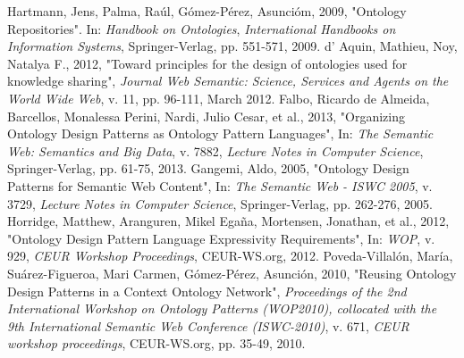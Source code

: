\begin{thebibliography}{100}
     Hartmann, Jens, Palma, Raúl, Gómez-Pérez, Asuncióm, 2009, "Ontology Repositories". In: \textit{Handbook on Ontologies}, \textit{International Handbooks on Information Systems}, Springer-Verlag, pp. 551-571, 2009.
     d' Aquin, Mathieu, Noy, Natalya F., 2012, "Toward principles for the design of ontologies used for knowledge sharing", \textit{Journal Web Semantic: Science, Services and Agents on the World Wide Web}, v. 11, pp. 96-111, March 2012.
     Falbo, Ricardo de Almeida, Barcellos, Monalessa Perini, Nardi, Julio Cesar, et al., 2013, "Organizing Ontology Design Patterns as Ontology Pattern Languages", In: \textit{The Semantic Web: Semantics and Big Data}, v. 7882, \textit{Lecture Notes in Computer Science}, Springer-Verlag, pp. 61-75, 2013.
     Gangemi, Aldo, 2005, "Ontology Design Patterns for Semantic Web Content", In: \textit{The Semantic Web - ISWC 2005}, v. 3729, \textit{Lecture Notes in Computer Science}, Springer-Verlag, pp. 262-276, 2005.
     Horridge, Matthew, Aranguren, Mikel Egaña, Mortensen, Jonathan, et al., 2012, "Ontology Design Pattern Language Expressivity Requirements", In: \textit{WOP}, v. 929, \textit{CEUR Workshop Proceedings}, CEUR-WS.org, 2012.
     Poveda-Villalón, María, Suárez-Figueroa, Mari Carmen, Gómez-Pérez, Asunción, 2010, "Reusing Ontology Design Patterns in a Context Ontology Network", \textit{Proceedings of the 2nd International Workshop on Ontology Patterns (WOP2010), collocated with the 9th International Semantic Web Conference (ISWC-2010)}, v. 671, \textit{CEUR workshop proceedings}, CEUR-WS.org, pp. 35-49, 2010.
\end{thebibliography}
